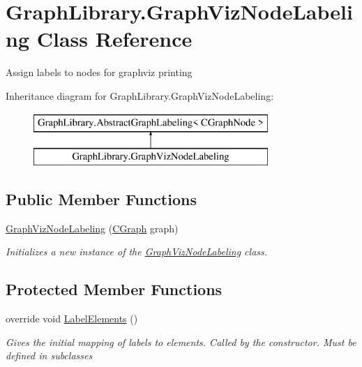 \hypertarget{class_graph_library_1_1_graph_viz_node_labeling}{}\section{Graph\+Library.\+Graph\+Viz\+Node\+Labeling Class Reference}
\label{class_graph_library_1_1_graph_viz_node_labeling}


Assign labels to nodes for graphviz printing  


Inheritance diagram for Graph\+Library.\+Graph\+Viz\+Node\+Labeling\+:\begin{figure}[H]
\begin{center}
\leavevmode
\includegraphics[height=2.000000cm]{class_graph_library_1_1_graph_viz_node_labeling}
\end{center}
\end{figure}
\subsection*{Public Member Functions}
\begin{DoxyCompactItemize}
\item 
\hyperlink{class_graph_library_1_1_graph_viz_node_labeling_a6f58204b07986a3a0f5799c5d92c4541}{Graph\+Viz\+Node\+Labeling} (\hyperlink{class_graph_library_1_1_c_graph}{C\+Graph} graph)
\begin{DoxyCompactList}\small\item\em Initializes a new instance of the \hyperlink{class_graph_library_1_1_graph_viz_node_labeling}{Graph\+Viz\+Node\+Labeling} class. \end{DoxyCompactList}\end{DoxyCompactItemize}
\subsection*{Protected Member Functions}
\begin{DoxyCompactItemize}
\item 
override void \hyperlink{class_graph_library_1_1_graph_viz_node_labeling_a8688ea6cf0ebe28a03fbce39c703d147}{Label\+Elements} ()
\begin{DoxyCompactList}\small\item\em Gives the initial mapping of labels to elements. Called by the constructor. Must be defined in subclasses \end{DoxyCompactList}\end{DoxyCompactItemize}

